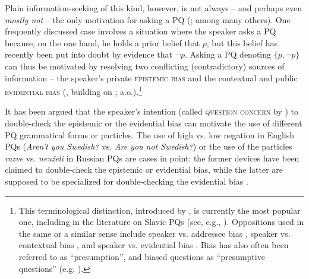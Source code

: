 \documentclass[output=paper,colorlinks,citecolor=brown]{langscibook}
\begin{document}
Plain information-seeking of this kind, however, is not always -- and perhaps even \textit{mostly not} -- the only motivation for asking a PQ (\citealt{vanRooy.Safarova2003,AnderBois2019,Repp.Geist2025}; among many others). One frequently discussed case involves a situation where the speaker asks a PQ because, on the one hand, he holds a prior belief that $p$, but this belief has recently been put into doubt by evidence that $\neg p$. Asking a PQ denoting $\{p,\neg p\}$ can thus be motivated by resolving two conflicting (contradictory) sources of information -- the speaker's private \textsc{epistemic bias} and the contextual and public \textsc{evidential bias} (\citealt{Sudo2013}, building on \citealt{Ladd1981,Buring.Gunlogson2000,Romero.Han2004}; a.o.).\footnote{This terminological distinction, introduced by \citet{Sudo2013}, is currently the most popular one, including in the literature on Slavic PQs (see, e.g., \citealt{Korotkova2023,Stankova2023,Repp.Geist2025}). Oppositions used in the same or a similar sense include speaker vs. addressee bias \citep{Rudin2022}, speaker vs. contextual bias \citep{Northrup2014}, and speaker vs. evidential bias \citep{Onoeva.Stankova2025}. Bias has also often been referred to as ``presumption'', and biased questions as ``presumptive questions'' (e.g. \citealt{Rakic1984}).}

It has been argued that the speaker's intention (called \textsc{question concern} by \citealt{Repp.Geist2025}) to double-check the epistemic or the evidential bias can motivate the use of different PQ grammatical forms or particles. The use of high vs. low negation in English PQs (\textit{Aren't you Swedish?} vs. \textit{Are you not Swedish?}) or the use of the particles \textit{razve} vs. \textit{neuželi} in Russian PQs are cases in point: the former devices have been claimed to double-check the epistemic or evidential bias, while the latter are supposed to be specialized for double-checking the evidential bias \citep{Romero.Han2004,Repp2013,Romero2015,Repp.Geist2025}.
\end{document}
